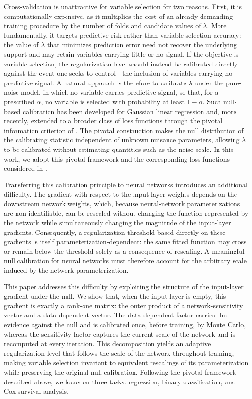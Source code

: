 \documentclass[twoside,11pt]{article}
\begin{document}
Cross-validation is unattractive for variable selection for two reasons. First, it is computationally expensive, as it multiplies the cost of an already demanding training procedure by the number of folds and candidate values of $\lambda$. More fundamentally, it targets predictive risk rather than variable-selection accuracy: the value of $\lambda$ that minimizes prediction error need not recover the underlying support and may retain variables carrying little or no signal. If the objective is variable selection, the regularization level should instead be calibrated directly against the event one seeks to control—the inclusion of variables carrying no predictive signal. A natural approach is therefore to calibrate $\lambda$ under the pure-noise model, in which no variable carries predictive signal, so that, for a prescribed $\alpha$, no variable is selected with probability at least $1-\alpha$. Such null-based calibration has been developed for Gaussian linear regression \citep{Dono94b,BCW11} and, more recently, extended to a broader class of loss functions through the pivotal information criterion of \citet{PIC-SMS2026}. The pivotal construction makes the null distribution of the calibrating statistic independent of unknown nuisance parameters, allowing $\lambda$ to be calibrated without estimating quantities such as the noise scale. In this work, we adopt this pivotal framework and the corresponding loss functions considered in \citet{PIC-SMS2026}.

Transferring this calibration principle to neural networks introduces an additional difficulty. The gradient with respect to the input-layer weights depends on the downstream network weights, which, because neural-network parameterizations are non-identifiable, can be rescaled without changing the function represented by the network while simultaneously changing the magnitude of the input-layer gradients. Consequently, a regularization threshold based directly on these gradients is itself parameterization-dependent: the same fitted function may cross or remain below the threshold solely as a consequence of rescaling. A meaningful null calibration for neural networks must therefore account for the arbitrary scale induced by the network parameterization.

This paper addresses this difficulty by exploiting the structure of the input-layer gradient under the null. We show that, when the input layer is empty, this gradient is exactly a rank-one matrix: the outer product of a network-sensitivity vector and a data-dependent vector. The data-dependent factor carries the evidence against the null and is calibrated once, before training, by Monte Carlo, whereas the sensitivity factor captures the current scale of the network and is recomputed at every iteration. This decomposition yields an adaptive regularization level that follows the scale of the network throughout training, making variable selection invariant to equivalent rescalings of its parameterization while preserving the original null calibration. Following the pivotal framework described above, we focus on three tasks: regression, binary classification, and Cox survival analysis.
\end{document}
